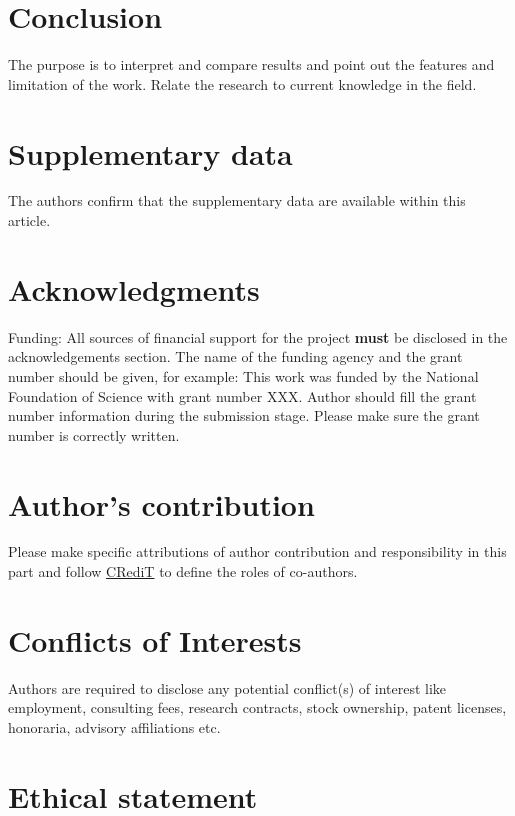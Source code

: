 \documentclass{ELSP}
\begin{document}
\section{Conclusion}

The purpose is to interpret and compare results and point out the
features and limitation of the work. Relate the research to current
knowledge in the field.

\section{Supplementary data}

The authors confirm that the supplementary data are available within this article.

\section*{Acknowledgments}
 
Funding: All sources of financial support for the project \textbf{must}
be disclosed in the acknowledgements section. The name of the funding
agency and the grant number should be given, for example: This work was
funded by the National Foundation of Science with grant number
XXX. Author should fill the grant number information during the
submission stage. Please make sure the grant number is correctly
written.

\section*{Author’s contribution}

Please make specific attributions of author
contribution and responsibility in this part and follow
\href{https://casrai.org/credit/}{CRediT} to define the roles of
co-authors.

\section*{Conflicts of Interests}

Authors are required to disclose any potential
conflict(s) of interest like employment, consulting fees, research
contracts, stock ownership, patent licenses, honoraria, advisory
affiliations etc.

\section*{Ethical statement}
\end{document}
